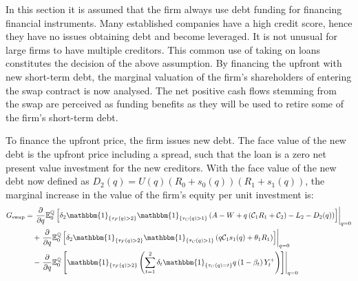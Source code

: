 \documentclass[main.tex]{subfiles}
\begin{document}
        In this section it is assumed that the firm always use debt funding for financing financial instruments.
        Many established companies have a high credit score,
        hence they have no issues obtaining debt and become leveraged.
        It is not unusual for large firms to have multiple creditors.
        This common use of taking on loans constitutes the decision of the above assumption.
        By financing the upfront with new short-term debt, the marginal valuation of the firm's shareholders of entering the swap contract is now analysed.
        The net positive cash flows stemming from the swap are perceived as funding benefits as they will be used to retire some of the firm's short-term debt.
        
        To finance the upfront price, the firm issues new debt.
        The face value of the new debt is the upfront price including a spread, 
        such that the loan is a zero net present value investment for the new creditors.
        With the face value of the new debt now defined as $D_{2}(q) = U(q)(R_{0} + s_{0}(q))(R_{1} + s_{1}(q))$,
        the marginal increase in the value of the firm's equity per unit investment is:
        \begin{align}
            G_{\text{swap}} &=
            \left.\frac{\partial}{\partial q}
            \mathbb{E}_{0}^{\rnmeasure}\left[
                \delta_{2} \mathbbm{1}_{\{\tau_{F}(q)>2\}} \mathbbm{1}_{\{\tau_{C}(q)>1\}}
                \left(
                    A - W
                    + q\left(\mathcal{C}_{1} R_{1} + \mathcal{C}_{2}\right)
                    - L_{2}
                    - D_{2}(q)
                \right)
            \right]\right\rvert_{q=0}
            \nonumber
            \\
            &\quad+
            \left.\frac{\partial}{\partial q}
            \mathbb{E}_{0}^{\rnmeasure}\left[
                \delta_2 \mathbbm{1}_{\{\tau_{F}(q)>2\}} \mathbbm{1}_{\{\tau_{C}(q)>1\}}
                \left(q\mathcal{C}_{1} s_1(q) + \theta_{1}R_{1}\right)
            \right]\right\rvert_{q=0}
            \nonumber
            \\
            &\quad-
            \left.\frac{\partial}{\partial q}
            \mathbb{E}_{0}^{\rnmeasure}\left[
                \mathbbm{1}_{\{\tau_{F}(q)>2\}}
                \left(
                    \sum_{t=1}^{2} \delta_{t} \mathbbm{1}_{\{\tau_{C}(q)=t\}}q\left(1-\beta_t\right)Y_{t}^{+}
                \right)
            \right]\right\rvert_{q=0}
            \label{eqn:G-debt-multi-step-1}
        \end{align}
\end{document}
